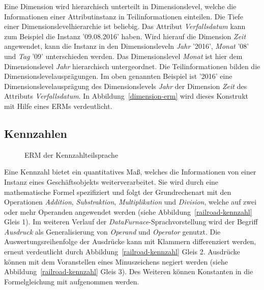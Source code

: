 \documentclass[
  language=german, %
  type=bachelor,%
  ngerman
]{isthesis}
\begin{document}
\begin{content}
	Eine Dimension wird hierarchisch unterteilt in Dimensionslevel, welche die
	Informationen einer Attributinstanz in Teilinformationen einteilen. Die Tiefe
	einer Dimensionslevelhierarchie ist beliebig. Das Attribut
	\textit{Verfallsdatum} kann zum Beispiel die Instanz '09.08.2016' haben. Wird
	hierauf die Dimension \textit{Zeit} angewendet, kann die Instanz in den
	Dimensionsleveln \textit{Jahr} '2016', \textit{Monat} '08' und \textit{Tag}
	'09' unterschieden werden. Das Dimensionslevel \textit{Monat} ist hier dem
	Dimensionslevel \textit{Jahr} hierarchisch untergeordnet. Die
	Teilinformationen bilden die Dimensionslevelausprägungen. Im oben genannten
	Beispiel ist '2016' eine Dimensionslevelausprägung des Dimensionslevels
	\textit{Jahr} der Dimension \textit{Zeit} des Attributs
	\textit{Verfallsdatum}. In Abbildung~\ref{dimension-erm} wird dieses
	Konstrukt mit Hilfe eines \acrshort{ERM}s verdeutlicht.

  \subsection{Kennzahlen}

  \begin{figure}
    \resizebox{300px}{!}{}
    \caption{\acrshort{ERM} der Kennzahlteilsprache}\label{kennzahl}
  \end{figure}

	Eine Kennzahl bietet ein quantitatives Maß, welches die Informationen von
	einer Instanz eines Geschäftsobjekts weiterverarbeitet. Sie
	wird durch eine mathematische Formel spezifiziert und folgt der
	Grundrechenart mit den Operationen \textit{Addition}, \textit{Substraktion},
	\textit{Multiplikation} und \textit{Division}, welche auf zwei oder mehr
	Operanden angewendet werden (siehe Abbildung~\ref{railroad-kennzahl} Gleis
	1). Im weiteren Verlauf der \textit{DataFurnace}-Sprachvorstellung wird
	der Begriff \textit{Ausdruck} als Generalisierung von \textit{Operand} und
	\textit{Operator} genutzt.  Die Auswertungsreihenfolge der Ausdrücke kann mit
	Klammern differenziert werden, erneut verdeutlicht durch
	Abbildung~\ref{railroad-kennzahl} Gleis 2.  Ausdrücke können mit dem
	Voranstellen eines Minuszeichens negiert werden (siehe
	Abbildung~\ref{railroad-kennzahl} Gleis 3). Des Weiteren können
	Konstanten in die Formelgleichung mit aufgenommen werden.


\end{content}
\end{document}
